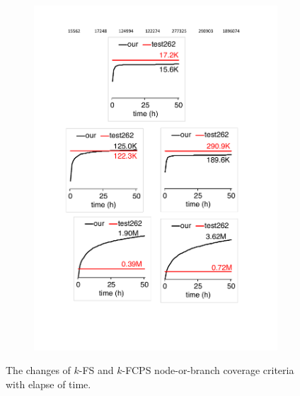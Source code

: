 \begin{figure}
\begin{subfigure}{0.19\textwidth}
    \includegraphics[width=\textwidth]{img/cov-2-fcp}
  \end{subfigure}
  \caption{
    The changes of $k$-FS and $k$-FCPS node-or-branch coverage criteria with
    elapse of time.
  }
  \label{fig:cov-time}
\end{figure}


